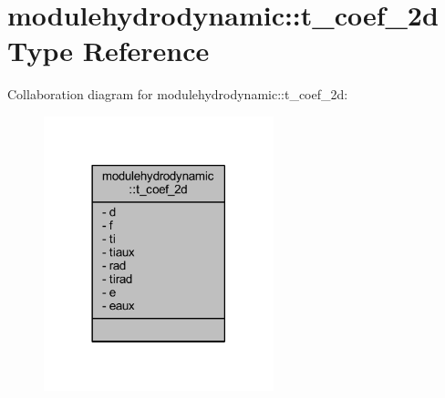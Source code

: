 \hypertarget{structmodulehydrodynamic_1_1t__coef__2d}{}\section{modulehydrodynamic\+:\+:t\+\_\+coef\+\_\+2d Type Reference}
\label{structmodulehydrodynamic_1_1t__coef__2d}


Collaboration diagram for modulehydrodynamic\+:\+:t\+\_\+coef\+\_\+2d\+:\nopagebreak
\begin{figure}[H]
\begin{center}
\leavevmode
\includegraphics[width=189pt]{structmodulehydrodynamic_1_1t__coef__2d__coll__graph}
\end{center}
\end{figure}
